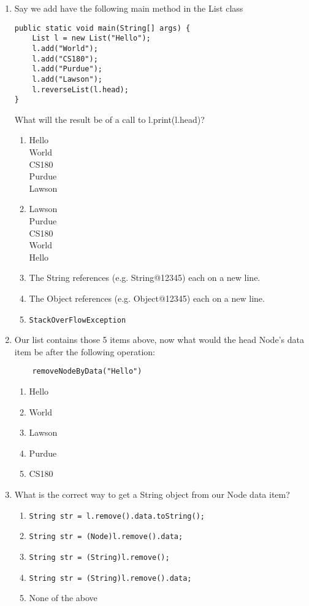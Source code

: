 \documentclass[S17-Final.tex]{subfiles}
\begin{document}
\begin{enumerate}
\item Say we add have the following main method in the List class
\begin{lstlisting}
public static void main(String[] args) {
    List l = new List("Hello");
    l.add("World");
    l.add("CS180");
    l.add("Purdue");
    l.add("Lawson");
    l.reverseList(l.head);
}
\end{lstlisting}
	
What will the result be of a call to l.print(l.head)?

\begin{enumerate}
\item  Hello\\
	    World\\
	    CS180\\
	    Purdue\\
	    Lawson
\item  Lawson\\
	    Purdue\\
	    CS180\\
    World\\
    Hello
\item  The String references (e.g. String@12345) each on a new line.
\item  The Object references (e.g. Object@12345) each on a new line.
\item  \texttt{StackOverFlowException}
\end{enumerate}
\clearpage
\item Our list contains those 5 items above, now what would the head Node's data item be after the following operation:
\begin{lstlisting}
    removeNodeByData("Hello")
\end{lstlisting}
	
\begin{enumerate}
\item  Hello
\item  World
\item  Lawson
\item  Purdue
\item  CS180
\end{enumerate}

\item What is the correct way to get a String object from our Node data item?

\begin{enumerate}
\item  \texttt{String str = l.remove().data.toString();}
\item  \texttt{String str = (Node)l.remove().data;}
\item  \texttt{String str = (String)l.remove();}
\item  \texttt{String str = (String)l.remove().data;}
\item  None of the above
\end{enumerate}


\end{enumerate}
\end{document}
